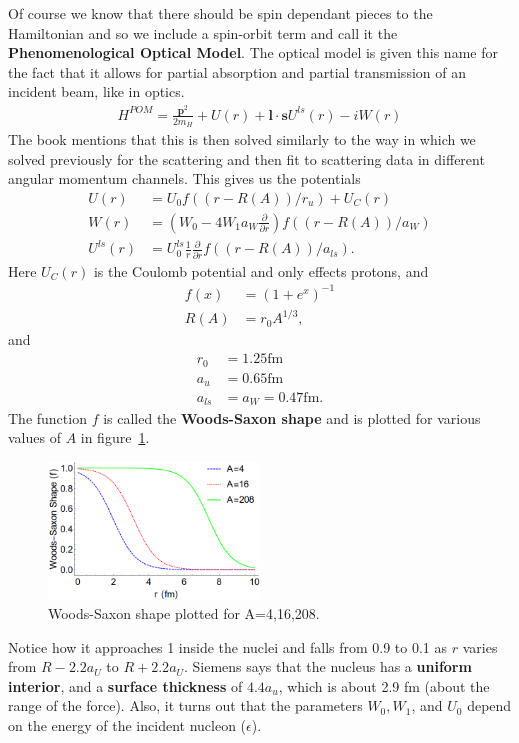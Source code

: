 \documentclass[12pt]{extarticle}
\begin{document}
Of course we know that there should be spin dependant pieces to the Hamiltonian and so we include a spin-orbit term and call it the \textbf{Phenomenological Optical Model}. The optical model is given this name for the fact that it allows for partial absorption and partial transmission of an incident beam, like in optics.
\begin{align}
   H^{POM}=\frac{\mathbf{p}^2}{2m_H} + U(r) + \mathbf{l}\cdot\mathbf{s}U^{ls}(r) - iW(r)
\end{align}
The book mentions that this is then solved similarly to the way in which we solved previously for the scattering and then fit to scattering data in different angular momentum channels. This gives us the potentials
\begin{align}
   U(r) &= U_0f((r-R(A))/r_u)+U_C(r) \\
   W(r) &= \left(W_0-4W_1a_W\frac{\partial}{\partial r}\right)f((r-R(A))/a_W) \\
   U^{ls}(r) &= U^{ls}_0\frac{1}{r}\frac{\partial}{\partial r}f((r-R(A))/a_{ls}).
\end{align}
Here $U_C(r)$ is the Coulomb potential and only effects protons, and 
\begin{align}
   f(x) &= (1+e^{x})^{-1} \\
   R(A) &= r_0 A^{1/3},
\end{align}
and
\begin{align}
   r_0 &= 1.25 \mathrm{fm} \\
   a_u &= 0.65 \mathrm{fm} \\
   a_{ls} &= a_W = 0.47 \mathrm{fm}.
\end{align}
The function $f$ is called the \textbf{Woods-Saxon shape} and is plotted for various values of $A$ in figure~\ref{fig:woodssaxon}.
\begin{figure}[h]
   \centering
   \includegraphics[width=0.5\textwidth]{woodssaxon.png}
   \caption{Woods-Saxon shape plotted for A=4,16,208.}
   \label{fig:woodssaxon}
\end{figure}
Notice how it approaches 1 inside the nuclei and falls from 0.9 to 0.1 as $r$ varies from $R-2.2a_U$ to $R+2.2a_U$. Siemens says that the nucleus has a \textbf{uniform interior}, and a \textbf{surface thickness} of $4.4a_u$, which is about 2.9 fm (about the range of the force). Also, it turns out that the parameters $W_0, W_1$, and $U_0$ depend on the energy of the incident nucleon ($\epsilon$).
\end{document}
